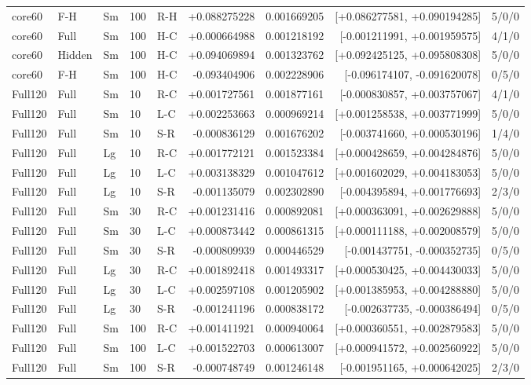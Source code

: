 \begin{longtable}{lllllrrrr}
core60 & F-H & Sm & 100 & R-H & +0.088275228 & 0.001669205 & [+0.086277581, +0.090194285] & 5/0/0 \\
core60 & Full & Sm & 100 & H-C & +0.000664988 & 0.001218192 & [-0.001211991, +0.001959575] & 4/1/0 \\
core60 & Hidden & Sm & 100 & H-C & +0.094069894 & 0.001323762 & [+0.092425125, +0.095808308] & 5/0/0 \\
core60 & F-H & Sm & 100 & H-C & -0.093404906 & 0.002228906 & [-0.096174107, -0.091620078] & 0/5/0 \\
Full120 & Full & Sm & 10 & R-C & +0.001727561 & 0.001877161 & [-0.000830857, +0.003757067] & 4/1/0 \\
Full120 & Full & Sm & 10 & L-C & +0.002253663 & 0.000969214 & [+0.001258538, +0.003771999] & 5/0/0 \\
Full120 & Full & Sm & 10 & S-R & -0.000836129 & 0.001676202 & [-0.003741660, +0.000530196] & 1/4/0 \\
Full120 & Full & Lg & 10 & R-C & +0.001772121 & 0.001523384 & [+0.000428659, +0.004284876] & 5/0/0 \\
Full120 & Full & Lg & 10 & L-C & +0.003138329 & 0.001047612 & [+0.001602029, +0.004183053] & 5/0/0 \\
Full120 & Full & Lg & 10 & S-R & -0.001135079 & 0.002302890 & [-0.004395894, +0.001776693] & 2/3/0 \\
Full120 & Full & Sm & 30 & R-C & +0.001231416 & 0.000892081 & [+0.000363091, +0.002629888] & 5/0/0 \\
Full120 & Full & Sm & 30 & L-C & +0.000873442 & 0.000861315 & [+0.000111188, +0.002008579] & 5/0/0 \\
Full120 & Full & Sm & 30 & S-R & -0.000809939 & 0.000446529 & [-0.001437751, -0.000352735] & 0/5/0 \\
Full120 & Full & Lg & 30 & R-C & +0.001892418 & 0.001493317 & [+0.000530425, +0.004430033] & 5/0/0 \\
Full120 & Full & Lg & 30 & L-C & +0.002597108 & 0.001205902 & [+0.001385953, +0.004288880] & 5/0/0 \\
Full120 & Full & Lg & 30 & S-R & -0.001241196 & 0.000838172 & [-0.002637735, -0.000386494] & 0/5/0 \\
Full120 & Full & Sm & 100 & R-C & +0.001411921 & 0.000940064 & [+0.000360551, +0.002879583] & 5/0/0 \\
Full120 & Full & Sm & 100 & L-C & +0.001522703 & 0.000613007 & [+0.000941572, +0.002560922] & 5/0/0 \\
Full120 & Full & Sm & 100 & S-R & -0.000748749 & 0.001246148 & [-0.001951165, +0.000642025] & 2/3/0 \\

\end{longtable}

